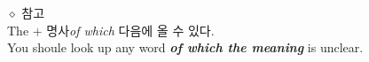 \documentclass[a4paper]{oblivoir}
\begin{document}
\begin{enumerate}
              $\diamond $ 참고
              \\ \lbrack The + 명사 \emph{of which} 다음에 올 수 있다. 
              \\  You shoule look up any word \textbf{\emph{of which the meaning}} is unclear.

    


    \end{enumerate}
\end{document}
